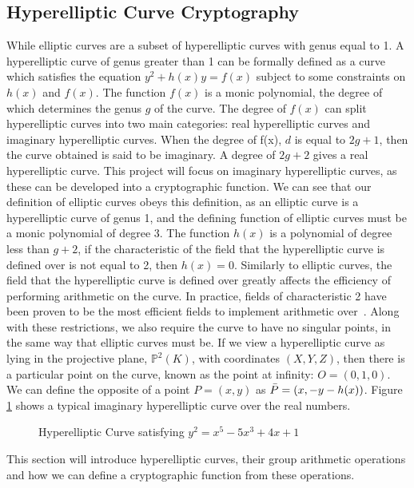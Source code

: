 \subsection{Hyperelliptic Curve Cryptography}
While elliptic curves are a subset of hyperelliptic curves with genus equal to 1. A hyperelliptic curve of genus greater than 1 can be formally defined as a curve which satisfies the equation $y^2 + h(x)y = f(x)$ subject to some constraints on $h(x)$ and $f(x)$. The function $f(x)$ is a monic polynomial, the degree of which determines the genus $g$ of the curve. The degree of $f(x)$ can split hyperelliptic curves into two main categories: real hyperelliptic curves and imaginary hyperelliptic curves. When the degree of f(x), $d$ is equal to $2g + 1$, then the curve obtained is said to be imaginary. A degree of $2g+2$ gives a real hyperelliptic curve. This project will focus on imaginary hyperelliptic curves, as these can be developed into a cryptographic function. We can see that our definition of elliptic curves obeys this definition, as an elliptic curve is a hyperelliptic curve of genus 1, and the defining function of elliptic curves must be a monic polynomial of degree 3. The function $h(x)$ is a polynomial of degree less than $g+2$, if the characteristic of the field that the hyperelliptic curve is defined over is not equal to 2, then $h(x) = 0$. Similarly to elliptic curves, the field that the hyperelliptic curve is defined over greatly affects the efficiency of performing arithmetic on the curve. In practice, fields of characteristic 2 have been proven to be the most efficient fields to implement arithmetic over~\cite{gaudry2009arithmetic}. Along with these restrictions, we also require the curve to have no singular points, in the same way that elliptic curves must be. If we view a hyperelliptic curve as lying in the projective plane, $\mathbb{P}^2(K)$, with coordinates $(X,Y,Z)$, then there is a particular point on the curve, known as the point at infinity: $\textit{O} = (0,1,0)$. We can define the opposite of a point $P = (x,y)$ as $\Bar{P} = (x, -y-h(x))$. Figure \ref{fig:HECC} shows a typical imaginary hyperelliptic curve over the real numbers.
\begin{figure}[!htb]
\centering
\resizebox{5cm}{!}{}
\caption{Hyperelliptic Curve satisfying $y^2=x^5-5x^3+4x+1$}
\label{fig:HECC}
\end{figure}

This section will introduce hyperelliptic curves, their group arithmetic operations and how we can define a cryptographic function from these operations.

